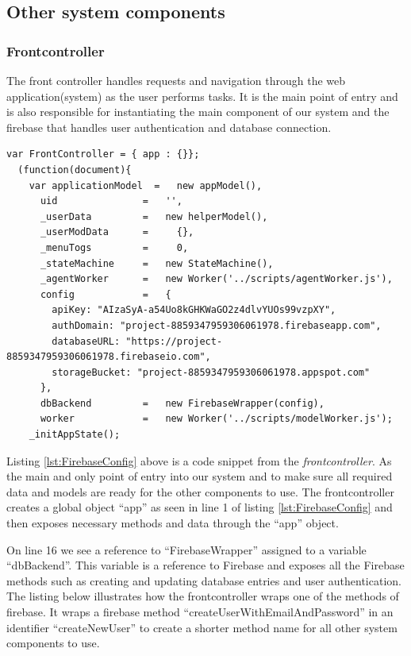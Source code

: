 \subsection{Other system components}
\subsubsection{Frontcontroller}
The front controller handles requests and navigation through the web application(system) as the user performs tasks. It is the main point of entry and is also responsible for instantiating the main component of our system and the firebase \cite{website:Firebase} that handles user authentication and database connection.

\begin{lstlisting}[caption={Initiating frontcontroller and creating an instance of Firebase}, label={lst:FirebaseConfig}]
var FrontController = { app : {}};
  (function(document){
    var applicationModel  =   new appModel(),
      uid               =   '',
      _userData         =   new helperModel(),
      _userModData      =     {},
      _menuTogs         =     0,
      _stateMachine     =   new StateMachine(),
      _agentWorker      =   new Worker('../scripts/agentWorker.js'),
      config            =   {
        apiKey: "AIzaSyA-a54Uo8kGHKWaGO2z4dlvYUOs99vzpXY",
        authDomain: "project-8859347959306061978.firebaseapp.com",
        databaseURL: "https://project-8859347959306061978.firebaseio.com",
        storageBucket: "project-8859347959306061978.appspot.com"
      },
      dbBackend         =   new FirebaseWrapper(config),
      worker            =   new Worker('../scripts/modelWorker.js');
    _initAppState();
\end{lstlisting}
Listing \ref{lst:FirebaseConfig} above is a code snippet from the \emph{frontcontroller}. As the main and only point of entry into our system and to make sure all required data and models are ready for the other components to use. The frontcontroller creates a global object ``app'' as seen in line 1 of listing \ref{lst:FirebaseConfig} and then exposes necessary methods and data through the ``app'' object.

On line 16 we see a reference to ``FirebaseWrapper'' assigned to a variable ``dbBackend''. This variable is a reference to Firebase and exposes all the Firebase methods such as creating and updating database entries and user authentication. The listing below illustrates how the frontcontroller wraps one of the methods of firebase. It wraps a firebase method ``createUserWithEmailAndPassword'' in an identifier ``createNewUser'' to create a shorter method name for all other system components to use.

